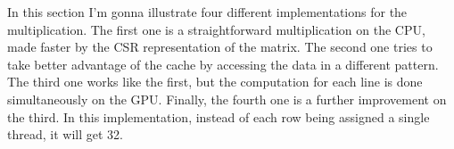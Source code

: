 \documentclass[conference]{IEEEtran}
\begin{document}
% 
% 
% 

In this section I'm gonna illustrate four different implementations for the multiplication. The first one is a straightforward multiplication on the CPU, made faster by the CSR representation of the matrix. The second one tries to take better advantage of the cache by accessing the data in a different pattern. The third one works like the first, but the computation for each line is done simultaneously on the GPU. Finally, the fourth one is a further improvement on the third. In this implementation, instead of each row being assigned a single thread, it will get 32.
\end{document}
